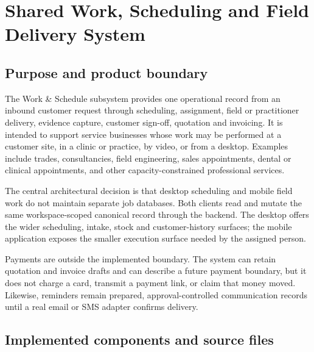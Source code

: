 
\section{Shared Work, Scheduling and Field Delivery System}
\label{sec:tessaris-work-schedule-field-delivery}

\subsection{Purpose and product boundary}

The Work \& Schedule subsystem provides one operational record from an inbound
customer request through scheduling, assignment, field or practitioner delivery,
evidence capture, customer sign-off, quotation and invoicing.  It is intended to
support service businesses whose work may be performed at a customer site, in a
clinic or practice, by video, or from a desktop.  Examples include trades,
consultancies, field engineering, sales appointments, dental or clinical
appointments, and other capacity-constrained professional services.

The central architectural decision is that desktop scheduling and mobile field
work do not maintain separate job databases.  Both clients read and mutate the
same workspace-scoped canonical record through the backend.  The desktop offers
the wider scheduling, intake, stock and customer-history surfaces; the mobile
application exposes the smaller execution surface needed by the assigned person.

Payments are outside the implemented boundary.  The system can retain quotation
and invoice drafts and can describe a future payment boundary, but it does not
charge a card, transmit a payment link, or claim that money moved.  Likewise,
reminders remain prepared, approval-controlled communication records until a
real email or SMS adapter confirms delivery.

\subsection{Implemented components and source files}


